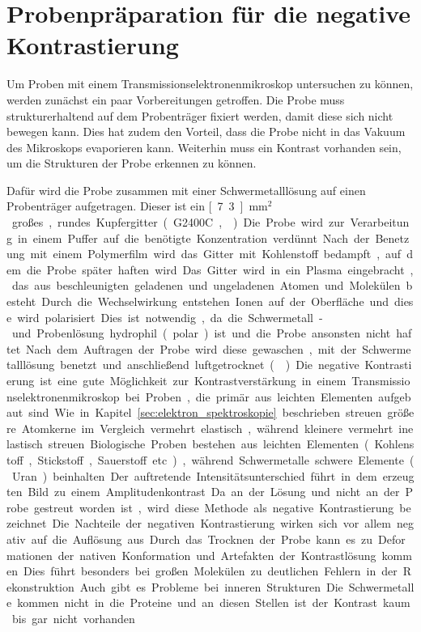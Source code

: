 \section{Probenpräparation für die negative Kontrastierung} %
\label{sec:probenpr_aparation_mit_negativer_kontrastierung}

Um Proben mit einem Transmissionselektronenmikroskop untersuchen zu können, werden zunächst ein paar Vorbereitungen getroffen.
Die Probe muss strukturerhaltend auf dem Probenträger fixiert werden, damit diese sich nicht bewegen kann.
Dies hat zudem den Vorteil, dass die Probe nicht in das Vakuum des Mikroskops evaporieren kann.
Weiterhin muss ein Kontrast vorhanden sein, um die Strukturen der Probe erkennen zu können.

Dafür wird die Probe zusammen mit einer Schwermetalllösung auf einen Probenträger aufgetragen.
Dieser ist ein \unit[7.3]{mm$^2$} großes, rundes Kupfergitter (G2400C, \cite{grid}).
Die Probe wird zur Verarbeitung in einem Puffer auf die benötigte Konzentration verdünnt.
Nach der Benetzung mit einem Polymerfilm wird das Gitter mit Kohlenstoff bedampft, auf dem die Probe später haften wird.
Das Gitter wird in ein Plasma eingebracht, das aus beschleunigten geladenen und ungeladenen Atomen und Molekülen besteht.
Durch die Wechselwirkung entstehen Ionen auf der Oberfläche und diese wird polarisiert.
Dies ist notwendig, da die Schwermetall- und Probenlösung hydrophil (polar) ist und die Probe ansonsten nicht haftet.
Nach dem Auftragen der Probe wird diese gewaschen, mit der Schwermetalllösung benetzt und anschließend luftgetrocknet (\cite{neg_stain}).

Die negative Kontrastierung ist eine gute Möglichkeit zur Kontrastverstärkung in einem Transmissionselektronenmikroskop bei Proben, die primär aus leichten Elementen aufgebaut sind.
Wie in Kapitel \ref{sec:elektron_spektroskopie} beschrieben streuen größere Atomkerne im Vergleich vermehrt elastisch, während kleinere vermehrt inelastisch streuen.
Biologische Proben bestehen aus leichten Elementen (Kohlenstoff, Stickstoff, Sauerstoff etc.), während Schwermetalle schwere Elemente (Uran) beinhalten.
Der auftretende Intensitätsunterschied führt in dem erzeugten Bild zu einem Amplitudenkontrast.
Da an der Lösung und nicht an der Probe gestreut worden ist, wird diese Methode als negative Kontrastierung bezeichnet.

Die Nachteile der negativen Kontrastierung wirken sich vor allem negativ auf die Auflösung aus.
Durch das Trocknen der Probe kann es zu Deformationen der nativen Konformation und Artefakten der Kontrastlösung kommen.
Dies führt besonders bei großen Molekülen zu deutlichen Fehlern in der Rekonstruktion.
Auch gibt es Probleme bei inneren Strukturen. 
Die Schwermetalle kommen nicht in die Proteine und an diesen Stellen ist der Kontrast kaum bis gar nicht vorhanden.

\FloatBarrier